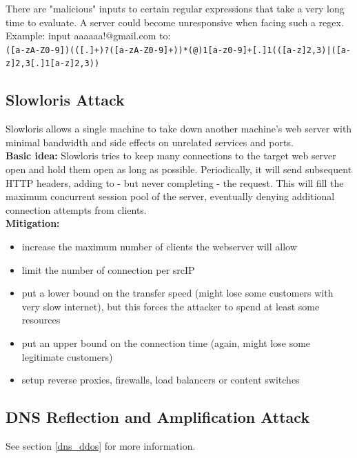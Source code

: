 \documentclass[11pt,oneside,a4paper]{article}
\begin{document}
There are "malicious" inputs to certain regular expressions that take a very long time to evaluate. A server could become unresponsive when facing such a regex.\\
Example: input aaaaaa!@gmail.com to:\\
\texttt{([a-zA-Z0-9])(([\-.]+)?([a-zA-Z0-9]+))*(@){1}[a-z0-9]+[.]{1}(([a-z]{2,3})|([a-z]{2,3}[.]{1}[a-z]{2,3}))}

\subsection{Slowloris Attack}

Slowloris allows a single machine to take down another machine's web server with minimal bandwidth and side effects on unrelated services and ports.\\
\textbf{Basic idea:} Slowloris tries to keep many connections to the target web server open and hold them open as long as possible. Periodically, it will send subsequent HTTP headers, adding to - but never completing - the request. This will fill the maximum concurrent session pool of the server, eventually denying additional connection attempts from clients.\\

\textbf{Mitigation:}

\vspace{-\topsep}
\begin{itemize}
	\setlength{\itemsep}{0pt}
	\setlength{\parskip}{0pt}
	\item increase the maximum number of clients the webserver will allow
	\item limit the number of connection per srcIP
	\item put a lower bound on the transfer speed (might lose some customers with very slow internet), but this forces the attacker to spend at least some resources
	\item put an upper bound on the connection time (again, might lose some legitimate customers)
	\item setup reverse proxies, firewalls, load balancers or content switches
\end{itemize}
\vspace{-\topsep}

\subsection{DNS Reflection and Amplification Attack}

See section \ref{dns_ddos} for more information.\\
\end{document}
